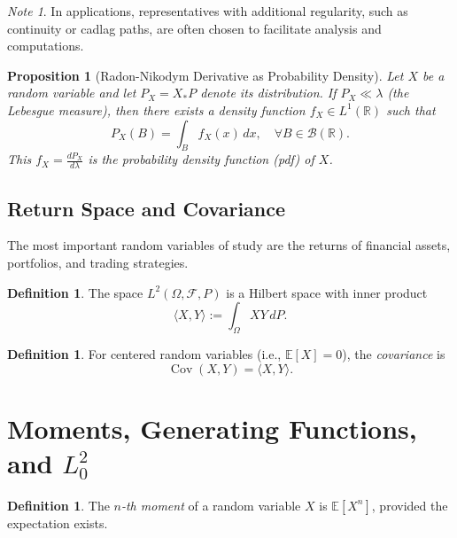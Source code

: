 \documentclass[11pt,reqno]{amsart}
\newtheorem{proposition}[theorem]{Proposition}
\theoremstyle{definition}
\newtheorem{definition}[theorem]{Definition}
\theoremstyle{remark}
\newtheorem*{note}{Note}
\begin{document}
\begin{note}
	In applications, representatives with additional regularity, such as continuity or cadlag paths, are often chosen to facilitate analysis and computations.
\end{note}

\begin{proposition}[Radon-Nikodym Derivative as Probability Density]
	Let $X$ be a random variable and let $P_X = X_*P$ denote its distribution. If $P_X \ll \lambda$ (the Lebesgue measure), then there exists a density function $f_X \in L^1(\mathbb{R})$ such that
	\[
		P_X(B) = \int_B f_X(x) \, dx, \quad \forall B \in \mathcal{B}(\mathbb{R}).
	\]
	This $f_X = \frac{dP_X}{d\lambda}$ is the \emph{probability density function} (pdf) of $X$.
\end{proposition}

\subsection{Return Space and Covariance}

The most important random variables of study are the returns of financial assets, portfolios, and trading strategies.

\begin{definition}
	The space $L^2(\Omega, \mathcal{F}, P)$ is a Hilbert space with inner product
	\[
		\langle X, Y \rangle := \int_\Omega X Y \, dP.
	\]
\end{definition}

\begin{definition}
	For centered random variables (i.e., $\mathbb{E}[X]=0$), the \emph{covariance} is
	\[
		\operatorname{Cov}(X, Y) = \langle X, Y \rangle.
	\]
\end{definition}

\section{Moments, Generating Functions, and \(L^2_0\)}

\begin{definition}
	The \emph{$n$-th moment} of a random variable $X$ is $\mathbb{E}[X^n]$, provided the expectation exists.
\end{definition}
\end{document}
